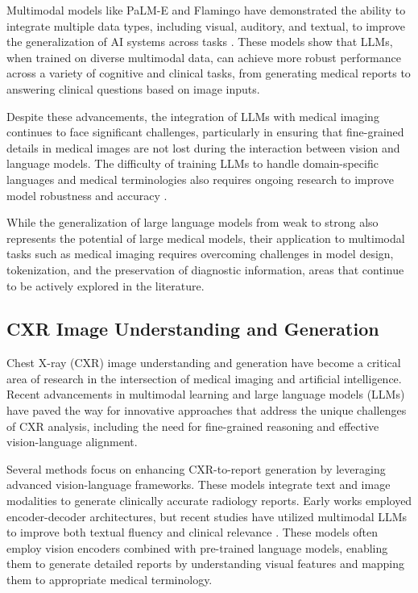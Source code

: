 Multimodal models like PaLM-E and Flamingo have demonstrated the ability to integrate multiple data types, including visual, auditory, and textual, to improve the generalization of AI systems across tasks \cite{song2024exploring}. These models show that LLMs, when trained on diverse multimodal data, can achieve more robust performance across a variety of cognitive and clinical tasks, from generating medical reports to answering clinical questions based on image inputs.

Despite these advancements, the integration of LLMs with medical imaging continues to face significant challenges, particularly in ensuring that fine-grained details in medical images are not lost during the interaction between vision and language models. The difficulty of training LLMs to handle domain-specific languages and medical terminologies also requires ongoing research to improve model robustness and accuracy \cite{huang2024video}. 

While the generalization of large language models from weak to strong \cite{zhou2025weak} also represents the potential of large medical models, their application to multimodal tasks such as medical imaging requires overcoming challenges in model design, tokenization, and the preservation of diagnostic information, areas that continue to be actively explored in the literature.

\subsection{CXR Image Understanding and Generation}

Chest X-ray (CXR) image understanding and generation have become a critical area of research in the intersection of medical imaging and artificial intelligence. Recent advancements in multimodal learning and large language models (LLMs) have paved the way for innovative approaches that address the unique challenges of CXR analysis, including the need for fine-grained reasoning and effective vision-language alignment.

Several methods focus on enhancing CXR-to-report generation by leveraging advanced vision-language frameworks. These models integrate text and image modalities to generate clinically accurate radiology reports. Early works employed encoder-decoder architectures, but recent studies have utilized multimodal LLMs to improve both textual fluency and clinical relevance \cite{kang2024wolf, kang2024wolf, lee2023llmcxr}. These models often employ vision encoders combined with pre-trained language models, enabling them to generate detailed reports by understanding visual features and mapping them to appropriate medical terminology.

